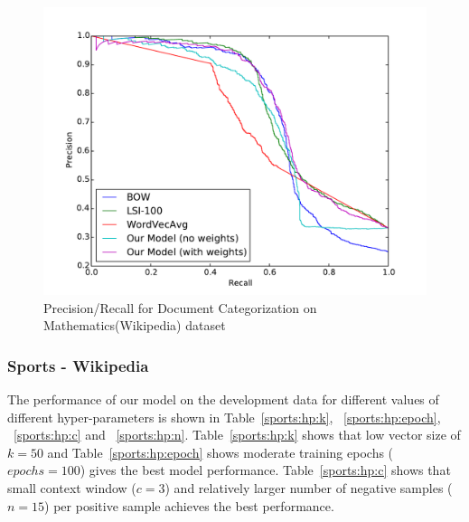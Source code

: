 \begin{figure}[tb]
\centering
        \includegraphics[width=0.8\columnwidth]{figs/pr/mathematics-cs.pdf}
    \caption{\footnotesize Precision/Recall for Document Categorization on Mathematics(Wikipedia) dataset}
    \label{fig:pr:mathematics:cs} 
\end{figure}

\subsubsection{Sports - Wikipedia}
The performance of our model on the development data for different values of different hyper-parameters is shown in Table~\ref{sports:hp:k}, ~\ref{sports:hp:epoch}, ~\ref{sports:hp:c} and ~\ref{sports:hp:n}. Table~\ref{sports:hp:k} shows that low vector size of $k = 50$ and Table~\ref{sports:hp:epoch} shows moderate training epochs ($epochs = 100$) gives the best model performance. 
Table~\ref{sports:hp:c} shows that small context window ($c = 3$) and relatively larger number of negative samples ($n = 15$) per positive sample achieves the best performance.

